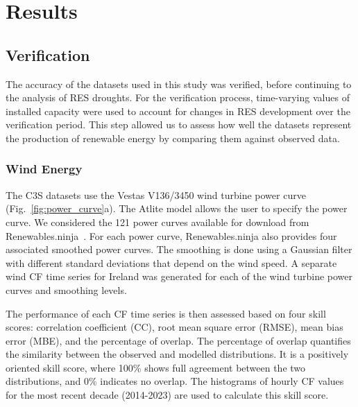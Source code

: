 \documentclass[preprint, 12pt]{elsarticle}
\begin{document}
\section{Results}
\label{sec:results}

\subsection{Verification}
\label{sec:verification}

The accuracy of the datasets used in this study was verified, before continuing to the analysis of RES droughts. For the verification process, time-varying values of installed capacity were used to account for changes in RES development over the verification period. This step allowed us to assess how well the datasets represent the production of renewable energy by comparing them against observed data.

\subsubsection{Wind Energy}
\label{sec:wind_verification}

The C3S datasets use the Vestas V136/3450 wind turbine power curve (Fig.~\ref{fig:power_curve}a). The Atlite model allows the user to specify the power curve. We considered the 121 power curves available for download from Renewables.ninja~\citep{staffell2016wake}. For each power curve, Renewables.ninja also provides four associated smoothed power curves. The smoothing is done using a Gaussian filter with different standard deviations that depend on the wind speed. A separate wind CF time series for Ireland was generated for each of the wind turbine power curves and smoothing levels.

The performance of each CF time series is then assessed based on four skill scores: correlation coefficient (CC), root mean square error (RMSE), mean bias error (MBE), and the percentage of overlap. The percentage of overlap quantifies the similarity between the observed and modelled distributions. It is a positively oriented skill score, where 100\% shows full agreement between the two distributions, and 0\% indicates no overlap. The histograms of hourly CF values for the most recent decade (2014-2023) are used to calculate this skill score.
\end{document}

